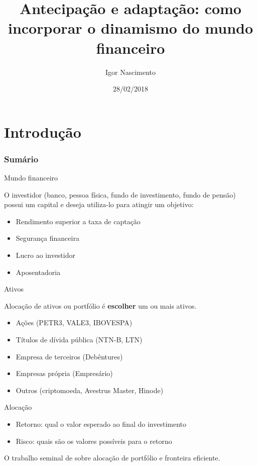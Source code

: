 \documentclass{beamer}
\title[Artigo]{Antecipação e adaptação: como incorporar o dinamismo do mundo financeiro}
\author[Igor Nascimento]{Igor Nascimento}
\institute[LAMFO]{Laboratório de Aprendizado de Máquina em Finanças e Organizações - LAMFO}
\date[2018]{28/02/2018}
\begin{document}
\begin{frame}
  \titlepage
\end{frame}

\section{Introdução}

\begin{frame}
\frametitle{Sumário}
\tableofcontents
\end{frame}




\begin{frame}{Mundo financeiro}

O investidor (banco, pessoa física, fundo de investimento, fundo de pensão) possui um capital e deseja utiliza-lo para atingir um objetivo:

\begin{itemize}
\item Rendimento superior a taxa de captação 
\item Segurança financeira
\item Lucro ao investidor
\item Aposentadoria
\end{itemize}

\end{frame}




\begin{frame}{Ativos}



Alocação de ativos ou portfólio é \textbf{escolher} um ou mais ativos.



\begin{itemize}
\item Ações (PETR3, VALE3, IBOVESPA)
\item Títulos de dívida pública (NTN-B, LTN)
\item Empresa de terceiros (Debêntures)
\item Empresas própria (Empresário)
\pause
\item Outros (criptomoeda, Avestrus Master, Hinode)
\end{itemize}


\end{frame}


\begin{frame}{Alocação}

\begin{itemize}
\item Retorno: qual o valor esperado ao final do investimento
\item Risco:   quais são os valores possíveis para o retorno
\end{itemize}

O trabalho seminal de \cite{mkv} sobre alocação de portfólio e fronteira eficiente.

\end{frame}
\end{document}
